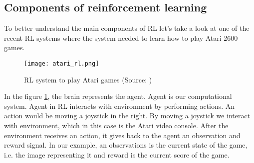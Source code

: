 

%
%
%




\subsection{Components of reinforcement learning}
To better understand the main components of RL let's take a
look at one of the recent RL systems where the system
needed to learn how to play Atari 2600 games.

\begin{figure}[H]
	\texttt{[image: atari\_rl.png]}
	\caption{
		RL system to play Atari games (Source: \cite{mnih2013playing})
		}
	\label{img:atari_rl}
\end{figure}
In the figure \ref{img:atari_rl}, the brain represents the agent. Agent is our
computational system.
Agent in RL interacts with environment by performing actions. An action would be moving a joystick in the right.
By moving a joystick
we interact with environment, which in this case is the Atari video console.
After the environment receives an action, it gives back to the agent an observation
and reward signal. In our example, an observations is the current state of the game,
i.e. the image representing it and reward is the current score of the game.
\\
